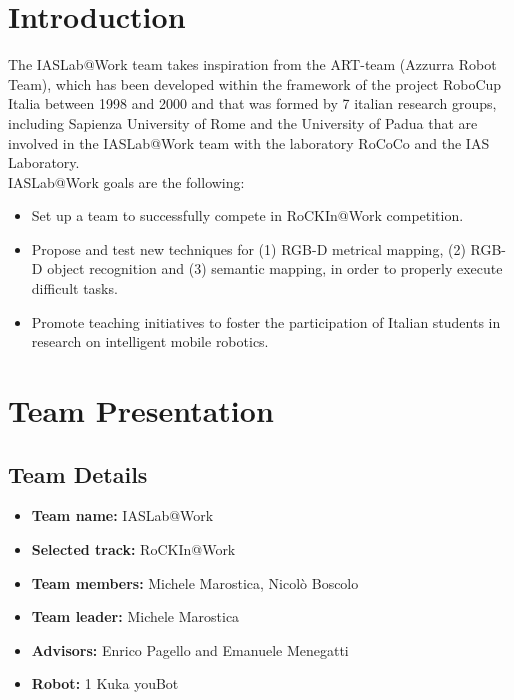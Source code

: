 \documentclass[conference]{IEEEtran}
\begin{document}
\section{Introduction}

The IASLab@Work team takes inspiration from the ART-team (Azzurra Robot Team), which has been developed within the framework of the project RoboCup Italia between 1998 and 2000 and that was formed by 7 italian research groups, including Sapienza University of Rome and the University of Padua that are involved in the IASLab@Work team with the laboratory RoCoCo and the IAS Laboratory.\\ 

IASLab@Work goals are the following:
\begin{itemize}
 \item Set up a team to successfully compete in RoCKIn@Work competition.
 \item Propose and test new techniques for (1) RGB-D metrical mapping, (2) RGB-D object recognition and (3) semantic mapping, in order to properly execute difficult tasks.
 \item Promote teaching initiatives to foster the participation of Italian students in research on intelligent mobile robotics.
\end{itemize}
 
\section{Team Presentation}
\subsection{Team Details}

\begin{itemize}
 \item \textbf{Team name:} IASLab@Work
 \item \textbf{Selected track:} RoCKIn@Work
 \item \textbf{Team members:} Michele Marostica, Nicolò Boscolo %
 \item \textbf{Team leader:} Michele Marostica %
 \item \textbf{Advisors:} Enrico Pagello and Emanuele Menegatti %
 \item \textbf{Robot:} 1 Kuka youBot
\end{itemize}
\end{document}

